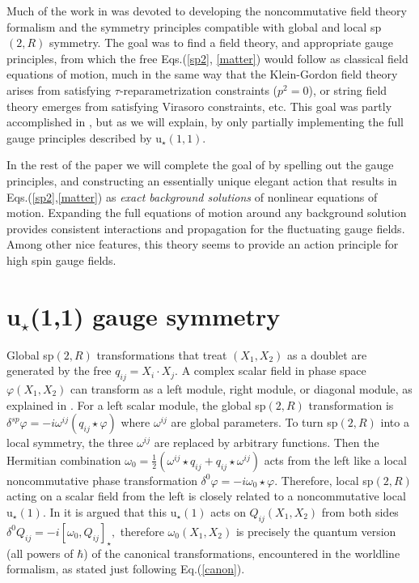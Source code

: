 \documentclass[a4paper,12pt]{article}
\begin{document}
Much of the work in \cite{NCSp} was devoted to developing the noncommutative
field theory formalism and the symmetry principles compatible with global
and local sp$\left( 2,R\right) $ symmetry. The goal was to find a field
theory, and appropriate gauge principles, from which the free Eqs.(\ref{sp2},%
\ref{matter}) would follow as classical field equations of motion, much in
the same way that the Klein-Gordon field theory arises from satisfying $\tau 
$-reparametrization constraints ($p^{2}=0$), or string field theory emerges
from satisfying Virasoro constraints, etc. This goal was partly accomplished
in \cite{NCSp}, but as we will explain, by only partially implementing the
full gauge principles described by u$_{\star }\left( 1,1\right) $.

In the rest of the paper we will complete the goal of \cite{NCSp} by
spelling out the gauge principles, and constructing an essentially unique
elegant action that results in Eqs.(\ref{sp2},\ref{matter}) as \textit{exact
background solutions} of nonlinear equations of motion. Expanding the full
equations of motion around any background solution provides consistent
interactions and propagation for the fluctuating gauge fields. Among other
nice features, this theory seems to provide an action principle for high
spin gauge fields.

\section{u$_{\star }$(1,1) gauge symmetry}

Global sp$\left( 2,R\right) $ transformations that treat $\left(
X_{1},X_{2}\right) $ as a doublet are generated by the free $%
q_{ij}=X_{i}\cdot X_{j}.$ A complex scalar field in phase space $\varphi
\left( X_{1},X_{2}\right) $ can transform as a left module, right module, or
diagonal module, as explained in \cite{NCSp}. For a left scalar module, the
global sp$\left( 2,R\right) $ transformation is $\delta ^{sp}\varphi
=-i\omega ^{ij}\left( q_{ij}\star \varphi \right) $ where $\omega ^{ij}$ are
global parameters. To turn sp$\left( 2,R\right) $ into a local symmetry, the
three $\omega ^{ij}$ are replaced by arbitrary functions. Then the Hermitian
combination $\omega _{0}=\frac{1}{2}\left( \omega ^{ij}\star
q_{ij}+q_{ij}\star \omega ^{ij}\right) $ acts from the left like a local
noncommutative phase transformation $\delta ^{0}\varphi =-i\omega _{0}\star
\varphi .$ Therefore, local sp$\left( 2,R\right) $ acting on a scalar field
from the left is closely related to a noncommutative local u$_{\star }\left(
1\right) .$ In \cite{NCSp} it is argued that this u$_{\star }\left( 1\right) 
$ acts on $Q_{ij}\left( X_{1},X_{2}\right) $ from both sides $\delta
^{0}Q_{ij}=-i\left[ \omega _{0},Q_{ij}\right] _{\star },$ therefore $\omega
_{0}\left( X_{1},X_{2}\right) $ is precisely the quantum version (all powers
of $\hbar $) of the canonical transformations, encountered in the worldline
formalism, as stated just following Eq.(\ref{canon}).
\end{document}

